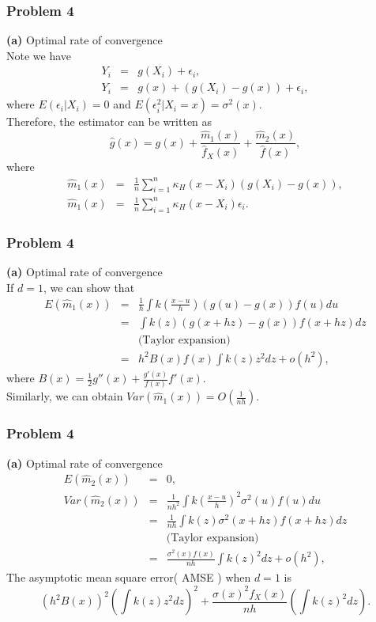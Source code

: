 \documentclass[10]{beamer}
\begin{document}
\begin{frame}
\frametitle{Problem 4}
\textbf{(a)} Optimal rate of convergence\\
Note we have
\begin{eqnarray*}
Y_i &=& g(X_i) + \epsilon_i, \\
Y_i &=& g(x) + (g(X_i) - g(x)) + \epsilon_i,
\end{eqnarray*}
where $E(\epsilon_i | X_i) = 0$ and $E(\epsilon^2_i | X_i = x) = \sigma^2(x)$. \\
Therefore, the estimator can be written as
\begin{equation*}
\hat{g}(x) = g(x) + \frac{\hat{m}_{1}(x)}{\hat{f}_{X}(x)} + \frac{\hat{m}_{2}(x)}{\hat{f}(x)},
\end{equation*}
where
\begin{eqnarray*}
\hat{m}_{1}(x) &=&  \frac{1}{n} \sum_{i = 1}^{n} \kappa_{H}(x - X_i)  (g(X_i) - g(x)), \\
\hat{m}_{1}(x) &=&  \frac{1}{n} \sum_{i = 1}^{n} \kappa_{H}(x - X_i)  \epsilon_i.
\end{eqnarray*}
\end{frame}

\begin{frame}
\frametitle{Problem 4}
\textbf{(a)} Optimal rate of convergence\\
If $d=1$, we can show that
\begin{eqnarray*}
E(\hat{m}_{1}(x)) &=& \frac{1}{h} \int k \left( \frac{x-u}{h} \right) (g(u) - g(x)) f(u) du\\
&=& \int k(z) (g(x+hz) - g(x)) f(x+hz) dz\\
&& \text{(Taylor expansion)} \\ 
&=& h^2 B(x) f(x) \int k(z) z^2 dz + o(h^2),
\end{eqnarray*}
where $B(x) = \frac{1}{2} g''(x) + \frac{g'(x)}{f(x)} f'(x)$.\\
Similarly, we can obtain $Var( \hat{m}_{1}(x)) = O(\frac{1}{nh})$.
\end{frame}

\begin{frame}
\frametitle{Problem 4}
\textbf{(a)} Optimal rate of convergence
\begin{eqnarray*}
E(\hat{m}_{2}(x)) &=& 0, \\
Var(\hat{m}_{2}(x)) &=& \frac{1}{nh^2} \int k \left( \frac{x-u}{h} \right)^2  \sigma^2(u) f(u) du \\
&=& \frac{1}{nh} \int  k(z) \sigma^2(x+hz) f(x+hz) dz \\
&& \text{(Taylor expansion)} \\
&=& \frac{\sigma^2(x)f(x)}{nh}  \int k(z)^2 dz + o(h^2),
\end{eqnarray*}
The asymptotic mean square error( AMSE ) when $d= 1$ is
\begin{equation*}
\left( h^{2} B(x) \right)^{2} \left( \int k(z) z^{2} dz \right)^{2} +  \frac{ \sigma(x)^{2} f_{X}(x)}{nh}  \left( \int k(z)^2 dz \right).
\end{equation*}
\end{frame}
\end{document}
